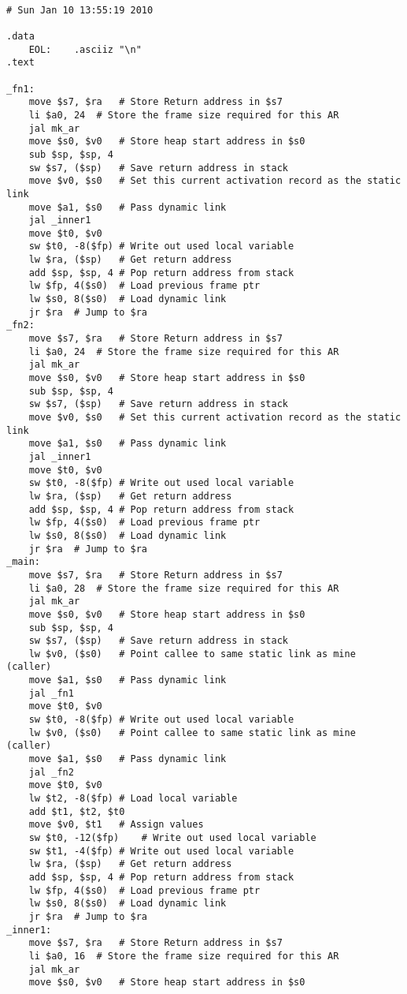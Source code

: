 \begin{lstlisting}[showstringspaces=false,breaklines=true,backgroundcolor=\color{light-gray}, captionpos=b]
         
# Sun Jan 10 13:55:19 2010

.data
	EOL:	.asciiz "\n"
.text

_fn1:
	move $s7, $ra	# Store Return address in $s7
	li $a0, 24	# Store the frame size required for this AR
	jal mk_ar
	move $s0, $v0	# Store heap start address in $s0
	sub $sp, $sp, 4
	sw $s7, ($sp)	# Save return address in stack
	move $v0, $s0	# Set this current activation record as the static link
	move $a1, $s0	# Pass dynamic link
	jal _inner1
	move $t0, $v0
	sw $t0, -8($fp)	# Write out used local variable
	lw $ra, ($sp)	# Get return address
	add $sp, $sp, 4	# Pop return address from stack
	lw $fp, 4($s0)	# Load previous frame ptr
	lw $s0, 8($s0)	# Load dynamic link
	jr $ra	# Jump to $ra
_fn2:
	move $s7, $ra	# Store Return address in $s7
	li $a0, 24	# Store the frame size required for this AR
	jal mk_ar
	move $s0, $v0	# Store heap start address in $s0
	sub $sp, $sp, 4
	sw $s7, ($sp)	# Save return address in stack
	move $v0, $s0	# Set this current activation record as the static link
	move $a1, $s0	# Pass dynamic link
	jal _inner1
	move $t0, $v0
	sw $t0, -8($fp)	# Write out used local variable
	lw $ra, ($sp)	# Get return address
	add $sp, $sp, 4	# Pop return address from stack
	lw $fp, 4($s0)	# Load previous frame ptr
	lw $s0, 8($s0)	# Load dynamic link
	jr $ra	# Jump to $ra
_main:
	move $s7, $ra	# Store Return address in $s7
	li $a0, 28	# Store the frame size required for this AR
	jal mk_ar
	move $s0, $v0	# Store heap start address in $s0
	sub $sp, $sp, 4
	sw $s7, ($sp)	# Save return address in stack
	lw $v0, ($s0)	# Point callee to same static link as mine (caller)
	move $a1, $s0	# Pass dynamic link
	jal _fn1
	move $t0, $v0
	sw $t0, -8($fp)	# Write out used local variable
	lw $v0, ($s0)	# Point callee to same static link as mine (caller)
	move $a1, $s0	# Pass dynamic link
	jal _fn2
	move $t0, $v0
	lw $t2, -8($fp)	# Load local variable
	add $t1, $t2, $t0
	move $v0, $t1	# Assign values
	sw $t0, -12($fp)	# Write out used local variable
	sw $t1, -4($fp)	# Write out used local variable
	lw $ra, ($sp)	# Get return address
	add $sp, $sp, 4	# Pop return address from stack
	lw $fp, 4($s0)	# Load previous frame ptr
	lw $s0, 8($s0)	# Load dynamic link
	jr $ra	# Jump to $ra
_inner1:
	move $s7, $ra	# Store Return address in $s7
	li $a0, 16	# Store the frame size required for this AR
	jal mk_ar
	move $s0, $v0	# Store heap start address in $s0

\end{lstlisting}
